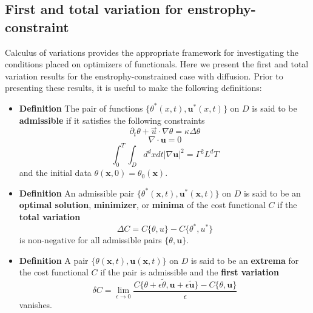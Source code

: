 \subsection{First and total variation for enstrophy-constraint}

Calculus of variations provides the appropriate framework for investigating the conditions placed on optimizers of functionals. Here we present the first and total variation results for the enstrophy-constrained case with diffusion. Prior to presenting these results, it is useful to make the following definitions:

\begin{itemize}
\vspace{0.25 cm}

\item \noindent \textbf{Definition} The pair of functions $\{\theta^{*}(x,t), \mathbf{u}^{*}(x,t)\}$ on $D$ is said to be \textbf{admissible} if it satisfies the following constraints \[\partial_{t}\theta+\vec{u}\cdot \nabla \theta=\kappa \Delta \theta \]
\[\nabla\cdot \mathbf{u}=0\]
\[\int_{0}^{T}\int_{D}d^{d}xdt |\nabla \mathbf{u}|^{2}=\Gamma^2L^{d}T\] and the initial data $\theta(\mathbf{x},0)=\theta_{0}(\mathbf{x})$.

\vspace{0.25 cm}

\item \noindent \textbf{Definition} An admissible pair $\{\theta^{*}(\mathbf{x},t), \mathbf{u}^{*}(\mathbf{x},t)\}$ on $D$ is said to be an \textbf{optimal solution}, \textbf{minimizer}, or \textbf{minima} of the cost functional $C$ if the \textbf{total variation}
\[\Delta C=C\{\theta, u \}-C\{\theta^{*},u^*\} \] is non-negative for all admissible pairs $\{\theta,\mathbf{u}\}$.

\vspace{0.25 cm}

\noindent

\item \noindent \textbf{Definition} A pair $\{\theta(\mathbf{x},t), \mathbf{u}(\mathbf{x},t)\}$ on $D$ is said to be an \textbf{extrema} for the cost functional $C$ if the pair is admissible and the \textbf{first variation}
\[\delta C=\lim_{\epsilon\rightarrow0}\frac{C\{\theta+\epsilon\tilde{\theta},\mathbf{u} + \epsilon\tilde{ \mathbf{u}}\}-C\{\theta,\mathbf{u}\}}{\epsilon} \] vanishes.
\end{itemize}


